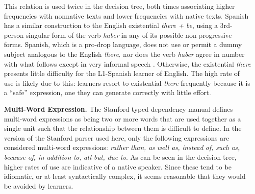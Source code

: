 \documentclass[main.tex]{subfiles}
\begin{document}
This relation is used twice in the decision tree, both times associating higher frequencies with nonnative texts and lower frequencies with native texts. Spanish has a similar construction to the English existential \textit{there + be}, using a 3rd-person singular form of the verb \textit{haber} in any of its possible non-progressive forms. Spanish, which is a pro-drop language, does not use or permit a dummy subject analogous to the English \textit{there}, nor does the verb \textit{haber} agree in number with what follows except in very informal speech \citep[pp. 429-32]{butt}. Otherwise, the existential \textit{there} presents little difficulty for the L1-Spanish learner of English. The high rate of use is likely due to this: learners resort to existential \textit{there} frequently because it is a ``safe'' expression, one they can generate correctly with little effort.


\textbf{Multi-Word Expression.} The Stanford typed dependency manual \citep{typed-deps-manual} defines multi-word expressions as being two or more words that are used together as a single unit such that the relationship between them is difficult to define. In the version of the Stanford parser used here, only the following expressions are considered multi-word expressions: \textit{rather than, as well as, instead of, such as, because of, in addition to, all but, due to}. As can be seen in the decision tree, higher rates of use are indicative of a native speaker. Since these tend to be idiomatic, or at least syntactically complex, it seems reasonable that they would be avoided by learners.

\end{document}
